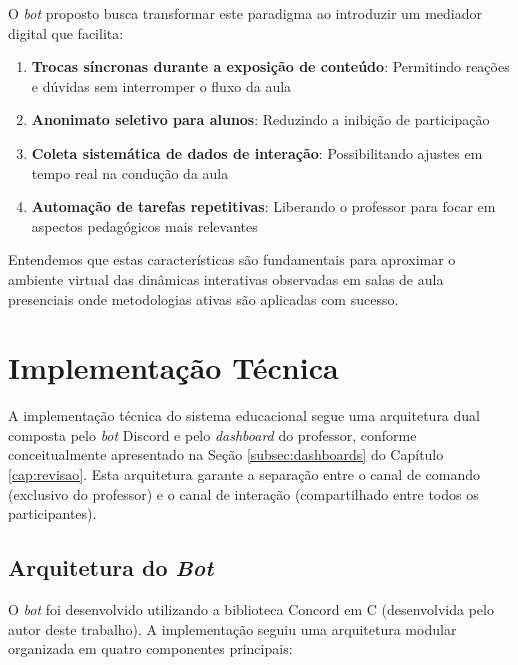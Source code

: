 O \textit{bot} proposto busca transformar este paradigma ao introduzir um
mediador digital que facilita:

\begin{enumerate}
\item \textbf{Trocas síncronas durante a exposição de conteúdo}: Permitindo
reações e dúvidas sem interromper o fluxo da aula
\item \textbf{Anonimato seletivo para alunos}: Reduzindo a inibição de
participação
\item \textbf{Coleta sistemática de dados de interação}: Possibilitando ajustes
em tempo real na condução da aula
\item \textbf{Automação de tarefas repetitivas}: Liberando o professor para
focar em aspectos pedagógicos mais relevantes
\end{enumerate}

Entendemos que estas características são fundamentais para aproximar o ambiente
virtual das dinâmicas interativas observadas em salas de aula presenciais onde
metodologias ativas são aplicadas com sucesso.

\section{Implementação Técnica}
\label{sec:implementacao}

A implementação técnica do sistema educacional segue uma arquitetura dual
composta pelo \textit{bot} Discord e pelo \textit{dashboard} do professor,
conforme conceitualmente apresentado na Seção \ref{subsec:dashboards} do
Capítulo \ref{cap:revisao}. Esta arquitetura garante a separação entre o canal
de comando (exclusivo do professor) e o canal de interação (compartilhado entre
todos os participantes).

\subsection{Arquitetura do \textit{Bot}}

O \textit{bot} foi desenvolvido utilizando a biblioteca Concord em C
(desenvolvida pelo autor deste trabalho). A implementação seguiu uma arquitetura
modular organizada em quatro componentes principais:

